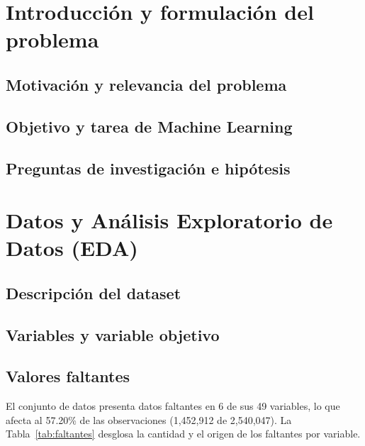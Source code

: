 \documentclass[conference]{IEEEtran}
\begin{document}
    \section{Introducción y formulación del problema}

    \subsection{Motivación y relevancia del problema}

    \subsection{Objetivo y tarea de Machine Learning}

    \subsection{Preguntas de investigación e hipótesis}

    \section{Datos y Análisis Exploratorio de Datos (EDA)}

    \subsection{Descripción del dataset}

    \subsection{Variables y variable objetivo}
 
    \subsection{Valores faltantes}

    \FloatBarrier

    El conjunto de datos presenta datos faltantes en 6 de sus 49 variables, lo que afecta al 57.20\% de las observaciones (1,452,912 de 2,540,047). La Tabla~\ref{tab:faltantes} desglosa la cantidad y el origen de los faltantes por variable.
\end{document}

